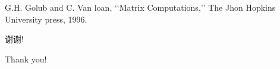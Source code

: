 \documentclass[no-math, xcolor=table]{beamer} %
\begin{document}





\begin{thebibliography}{10} %
 G.H. Golub and C. Van loan,
 \newblock ‘‘Matrix Computations,’’
 \newblock The Jhon Hopkins University press, 1996.
\end{thebibliography}

\begin{frame}[c,plain]
\begin{center}
谢\quad 谢!

  Thank you!
\end{center}
\end{frame}
\end{document}
